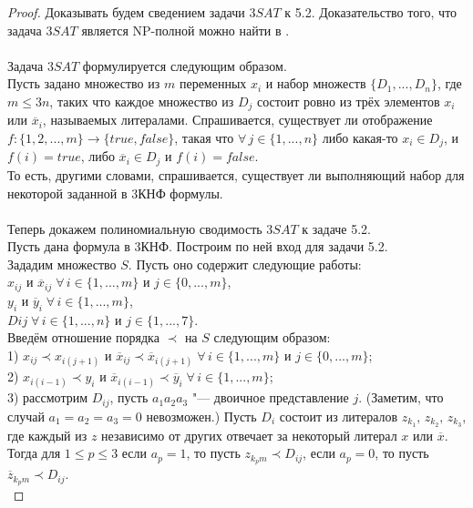 \documentclass[a4paper,12pt]{article}
\theoremstyle{plain} %
\theoremstyle{definition} %
\theoremstyle{remark} %
\begin{document}
\begin{proof}
	Доказывать будем сведением задачи $3SAT$ к 5.2. Доказательство того, что задача $3SAT$ является NP-полной можно найти в \cite{cook}.\\ \\
	Задача $3SAT$ формулируется следующим образом.\\
	Пусть задано множество из $m$ переменных $x_i$ и набор множеств $\{D_1, ..., D_n\}$, где $m \le 3n$, таких что каждое множество из $D_j$ состоит ровно из трёх элементов $x_i$ или $\overline{x}_i$, называемых литералами. Спрашивается, существует ли отображение $f: \{1, 2, ..., m\} \to \{true, false\}$, такая что $\forall \, j \in \{1, ..., n\}$ либо какая-то $x_i \in D_j$, и  $f(i) = true$, либо $\overline{x}_{i} \in D_j$ и $f(i) = false$.\\
	То есть, другими словами, спрашивается, существует ли выполняющий набор для некоторой заданной в 3КНФ формулы.\\ \\
	Теперь докажем полиномиальную сводимость $3SAT$ к задаче 5.2.\\
	Пусть дана формула в 3КНФ. Построим по ней вход для задачи 5.2.\\
	Зададим множество $S$. Пусть оно содержит следующие работы:\\
	$x_{ij}$ и $\overline{x}_{ij} \; \forall \, i \in \{1, ..., m\}$ и $j \in \{0, ..., m\}$,\\
	$y_i$ и $\overline{y}_{i} \; \forall \, i \in \{1, ..., m\}$,\\
	$D{ij} \; \forall \, i \in \{1, ..., n\}$ и $j \in \{1, ..., 7\}$.\\
	Введём отношение порядка $\prec$ на $S$ следующим образом:\\
	1) $x_{ij} \prec x_{i(j + 1)}$ и $\overline{x}_{ij} \prec \overline{x}_{i(j + 1)} \; \forall \, i \in \{1, ..., m\}$ и $j \in \{0, ..., m\}$;\\
	2) $x_{i(i - 1)} \prec y_i$ и $\overline{x}_{i(i - 1)} \prec \overline{y}_i \; \forall \, i \in \{1, ..., m\}$;\\
	3) рассмотрим $D_{ij}$, пусть $a_1 a_2 a_3$ "--- двоичное представление $j$. (Заметим, что случай $a_1 = a_2 = a_3 = 0$ невозможен.) Пусть $D_i$ состоит из литералов $z_{k_1}, \, z_{k_2}, \, z_{k_3}$, где каждый из $z$ независимо от других отвечает за некоторый литерал $x$ или $\overline{x}$. Тогда для $1 \le p \le 3$ если $a_p = 1$, то пусть $z_{k_p m} \prec D_{ij}$, если $a_p = 0$, то пусть $\overline{z}_{k_p m} \prec D_{ij}$.\\

\end{proof}
\end{document}
